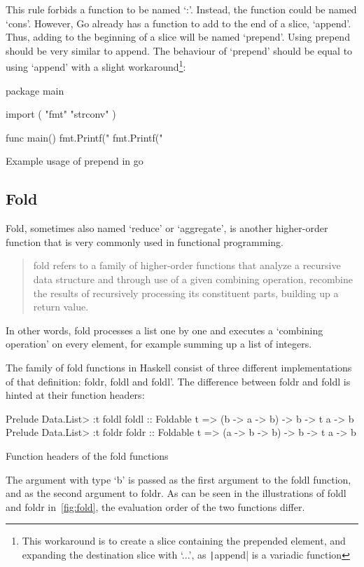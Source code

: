 This rule forbids a function to be named `:'. Instead, the function could be
named `cons'. However, Go already has a function to add to the end of a slice,
`append'. Thus, adding to the beginning of a slice will be named `prepend'.
Using prepend should be very similar to append. The behaviour of `prepend'
should be equal to using `append' with a slight workaround\footnote{This workaround
	is to create a slice containing the prepended element, and expanding the
destination slice with `...', as \texttt|append| is a variadic function}:

\begin{listing}
    \begin{gocode}
package main

import (
  "fmt"
  "strconv"
)

func main() {
	fmt.Printf("%
	fmt.Printf("%
}
\end{gocode}
    \caption{Example usage of prepend in go}\label{code:prepend-go}
\end{listing}
\subsection{Fold}\label{sec:fold}

Fold, sometimes also named `reduce' or `aggregate', is another higher-order function
that is very commonly used in functional programming.

\begin{quote}
	fold refers to a family of higher-order functions that
	analyze a recursive data structure and through use of a given
	combining operation, recombine the results of recursively processing its
	constituent parts, building up a return value.\autocite{fold-wiki}
\end{quote}

In other words, fold processes a list one by one and executes a `combining operation'
on every element, for example summing up a list of integers.

The family of fold functions in Haskell consist of three different implementations of
that definition: foldr, foldl and foldl'.
The difference between foldr and foldl is hinted at their function headers:
\begin{listing}
    \begin{haskellcode}
Prelude Data.List> :t foldl
foldl :: Foldable t => (b -> a -> b) -> b -> t a -> b
Prelude Data.List> :t foldr
foldr :: Foldable t => (a -> b -> b) -> b -> t a -> b
    \end{haskellcode}
    \caption{Function headers of the fold functions}
\end{listing}
The argument with type `b' is passed as the first argument to the foldl
function, and as the second argument to foldr. As can be seen in the illustrations
of foldl and foldr in~\ref{fig:fold}, the evaluation order of the two functions
differ.

